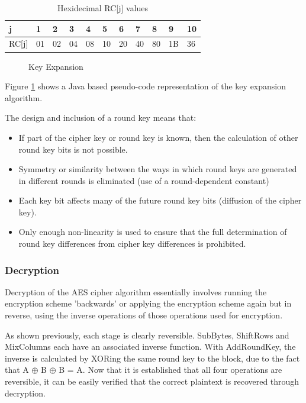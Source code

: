 \documentclass[a4paper,10pt]{report}
\begin{document}
\begin{table}[h]
\begin{center}
    \begin{tabular}{| l | l | l | l | l | l | l | l | l | l | l |}
    \hline
    j & 1 & 2 & 3 & 4 & 5 & 6 & 7 & 8 & 9 & 10\\ \hline
    RC[j] & 01 & 02 & 04 & 08 & 10 & 20 & 40 & 80 & 1B & 36\\
    \hline
    \end{tabular}
   \caption{Hexidecimal RC[j] values}
    \label{tab:rcj}
\end{center}
\end{table} 

\begin{figure}[htb]
\centering

\caption{Key Expansion }
\label{fig:keyexpcode}
\end{figure}

Figure \ref{fig:keyexpcode} shows a Java based pseudo-code representation of the key expansion algorithm.

The design and inclusion of a round key means that:
\begin{itemize}
 \item If part of the cipher key or round key is known, then the calculation of other round key bits is not possible.
 \item Symmetry or similarity between the ways in which round keys are generated in different rounds is eliminated (use of a round-dependent constant)
 \item Each key bit affects many of the future round key bits (diffusion of the cipher key).
 \item Only enough non-linearity is used to ensure that the full determination of round key differences from cipher key differences is prohibited. 
\end{itemize}

\subsubsection{Decryption}


Decryption of the AES cipher algorithm essentially involves running the encryption scheme 'backwards' or applying the encryption scheme again but in reverse, using the inverse operations of those operations used for encryption. 

As shown previously, each stage is clearly reversible. SubBytes, ShiftRows and MixColumns each have an associated inverse function. With AddRoundKey, the inverse is calculated by XORing the same round key to the block, due to the fact that A $\oplus$ B $\oplus$ B = A. Now that it is established that all four operations are reversible, it can be easily verified that the correct plaintext is recovered through decryption. 
\end{document}
